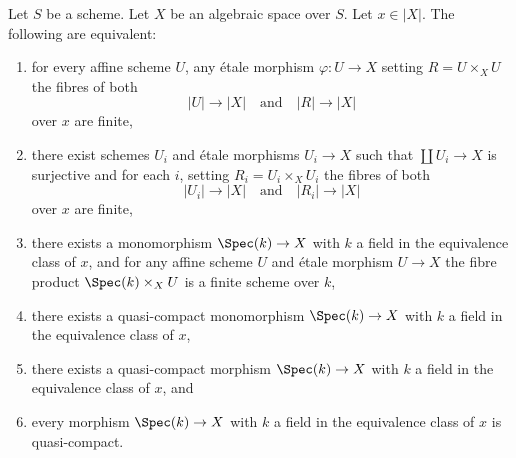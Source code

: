 \begin{lemma}
\label{lemma-UR-finite-above-x}
Let $S$ be a scheme. Let $X$ be an algebraic space over $S$.
Let $x \in |X|$. The following are equivalent:
\begin{enumerate}
\item for every affine scheme $U$, any \'etale morphism
$\varphi : U \to X$ setting $R = U \times_X U$ the fibres of both
$$
|U| \longrightarrow |X|
\quad\text{and}\quad
|R| \longrightarrow |X|
$$
over $x$ are finite,
\item there exist schemes $U_i$ and \'etale morphisms
$U_i \to X$ such that $\coprod U_i \to X$ is surjective and for each
$i$, setting $R_i = U_i \times_X U_i$ the fibres of both
$$
|U_i| \longrightarrow |X|
\quad\text{and}\quad
|R_i| \longrightarrow |X|
$$
over $x$ are finite,
\item there exists a monomorphism $\Spec(k) \to X$ with $k$ a field
in the equivalence class of $x$, and for any affine scheme $U$ and \'etale
morphism $U \to X$ the fibre product $\Spec(k) \times_X U$ is
a finite scheme over $k$,
\item there exists a quasi-compact monomorphism $\Spec(k) \to X$
with $k$ a field in the equivalence class of $x$,
\item there exists a quasi-compact morphism $\Spec(k) \to X$
with $k$ a field in the equivalence class of $x$, and
\item every morphism $\Spec(k) \to X$ with $k$ a field in the
equivalence class of $x$ is quasi-compact.
\end{enumerate}
\end{lemma}

